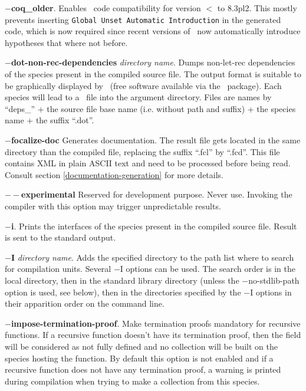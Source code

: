\begin{compact-itemize}
  \item[*] {\bf $-$coq\_older}.
    Enables \coq\ code compatibility for version $<$ to 8.3pl2. This
    mostly prevents inserting {\tt Global Unset Automatic
      Introduction} in the generated code, which is now required since
    recent versions of \coq\ now automatically introduce hypotheses
    that where not before.
  \item[*] {\bf $-$dot-non-rec-dependencies} {\em directory name}.
    Dumps non-let-rec dependencies of the species present in the
    compiled source file. The output format is suitable to be
    graphically displayed by \dotty\ (free software available via the
    \graphviz\ package). Each species will lead to a \dotty\ file into
    the argument directory. Files are names by ``deps\_'' + the source
    file base name (i.e. without path and suffix) + the species name +
    the suffix ``.dot''.

  \item[*] {\bf $-$focalize-doc} Generates documentation. The
    result file gets located in the same directory than the compiled
    file, replacing the suffix ``.fcl'' by ``.fcd''. This file contains
    XML in plain ASCII text and need to be processed before being read.
    Consult section \ref{documentation-generation} for more details.

  \item[*] {\bf $--$experimental} Reserved for development purpose.
    Never use. Invoking the compiler with this option may trigger
    unpredictable results.

  \item[*] {\bf $-$i}. Prints the interfaces of the species present in
    the compiled source file. Result is sent to the standard output.

  \item[*] {\bf $-$I} {\em directory name}. Adds the specified
    directory to the path list where to search for
    compilation units. Several $-$I options can be used. The search order is
    in the local directory, then in the standard library directory (unless the
    $-$no-stdlib-path option is used, see below), then in the
    directories specified by the $-$I options in their apparition
    order on the command line.

  \item[*] {\bf $-$impose-termination-proof}. Make termination proofs
    mandatory for recursive functions. If a recursive function doesn't
    have its termination proof, then the field will be considered as
    not fully defined and no collection will be built on the
    species hosting the function. By default this option is not
    enabled and if a recursive function does not have any termination
    proof, a warning is printed during compilation when trying to make
    a collection from this species.


\end{compact-itemize}
